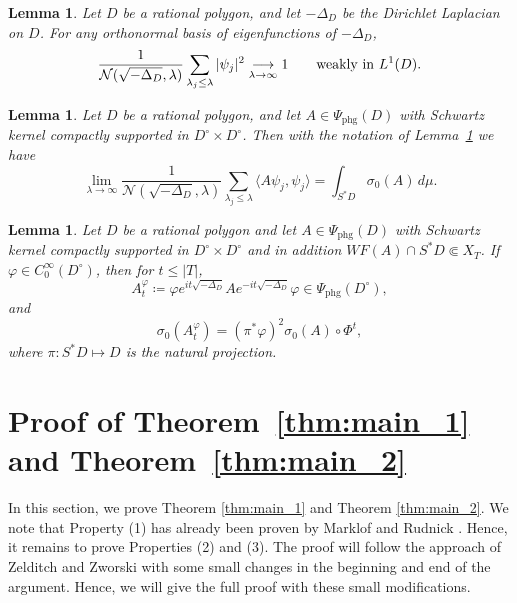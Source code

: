 \documentclass[10pt,a4paper]{amsart}
\newcommand{\1}{\mathrm{\mathbf{1}}}
\numberwithin{equation}{section}
\newtheorem{lemma}[thm]{Lemma}
\begin{document}
\begin{lemma}\label{LE:weak_convergence}
    Let $D$ be a rational polygon, and let $-\Delta_D$ be the Dirichlet Laplacian on $D$. For any orthonormal basis of eigenfunctions of $-\Delta_D$,
    \begin{equation*}
        \frac{1}{\mathcal{N}(\sqrt{-\Delta_D},\lambda)} \sum_{\lambda_j\leq \lambda} |\psi_j|^2 \underset{\lambda \rightarrow \infty}{\longrightarrow} 1 \qquad \text{{\textit weakly in }} L^1(D).
    \end{equation*}
\end{lemma}

\begin{lemma}\label{LE:Weyl_law_gene}
     Let $D$ be a rational polygon, and let $A\in \Psi_{\mathrm{phg}}(D)$ with Schwartz kernel compactly supported in $D^{\circ}\times D^{\circ}$. Then with the notation of Lemma~\ref{LE:weak_convergence} we have
     \begin{equation*}
          \lim_{\lambda\rightarrow \infty}\frac{1}{\mathcal{N}(\sqrt{-\Delta_D},\lambda)} \sum_{\lambda_j\leq \lambda} \langle A\psi_j,\psi_j\rangle = \int_{S^{*}D} \sigma_0(A) \, d\mu.
     \end{equation*}
\end{lemma}

\begin{lemma}\label{LE:Egorov}
    Let $D$ be a rational polygon and let $A\in \Psi_{\mathrm{phg}}(D)$ with Schwartz kernel compactly supported in $D^{\circ}\times D^{\circ}$ and in addition $WF(A) \cap S^{*}D \Subset X_T$. If $\varphi \in C_0^\infty(D^{\circ})$, then for $t\leq |T|$,
    \begin{equation*}
        A_t^\varphi \coloneqq \varphi e^{it\sqrt{-\Delta_D}} A  e^{-it\sqrt{-\Delta_D}} \varphi \in \Psi_{\mathrm{phg}}(D^{\circ}),
    \end{equation*}
    and
    \begin{equation*}
        \sigma_0( A_t^\varphi) = (\pi^{*} \varphi)^2 \sigma_0(A)\circ \Phi^t,
    \end{equation*}
    where $\pi:S^*D \mapsto D$ is the natural projection.
\end{lemma}


\section{Proof of Theorem~\ref{thm:main_1} and Theorem~\ref{thm:main_2}}

In this section, we prove Theorem \ref{thm:main_1} and Theorem \ref{thm:main_2}. We note that Property (1) has already been proven by Marklof and Rudnick \cite{MR2879311}. Hence, it remains to prove Properties (2) and (3). The proof will follow the approach of Zelditch and Zworski \cite{ZZ96} with some small changes in the beginning and end of the argument. Hence, we will give the full proof with these small modifications.
\end{document}

